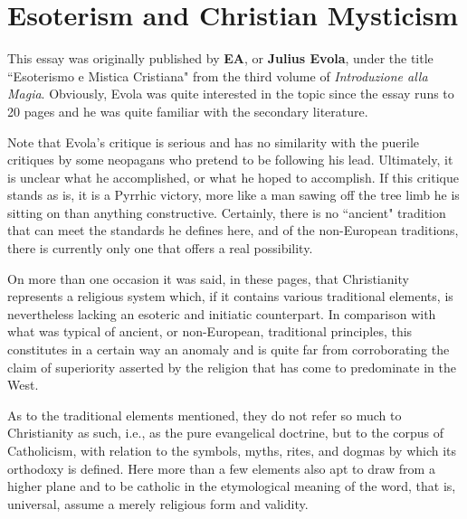 \section{Esoterism and Christian Mysticism}

\begin{quotex}
This essay was originally published by \textbf{EA}, or \textbf{Julius Evola}, under the title ``Esoterismo e Mistica Cristiana" from the third volume of \emph{Introduzione alla Magia}. Obviously, Evola was quite interested in the topic since the essay runs to 20 pages and he was quite familiar with the secondary literature.

Note that Evola's critique is serious and has no similarity with the puerile critiques by some neopagans who pretend to be following his lead. Ultimately, it is unclear what he accomplished, or what he hoped to accomplish. If this critique stands as is, it is a Pyrrhic victory, more like a man sawing off the tree limb he is sitting on than anything constructive. Certainly, there is no ``ancient" tradition that can meet the standards he defines here, and of the non-European traditions, there is currently only one that offers a real possibility.
\end{quotex}

On more than one occasion it was said, in these pages, that Christianity represents a religious system which, if it contains various traditional elements, is nevertheless lacking an esoteric and initiatic counterpart. In comparison with what was typical of ancient, or non-European, traditional principles, this constitutes in a certain way an anomaly and is quite far from corroborating the claim of superiority asserted by the religion that has come to predominate in the West.

As to the traditional elements mentioned, they do not refer so much to Christianity as such, i.e., as the pure evangelical doctrine, but to the corpus of Catholicism, with relation to the symbols, myths, rites, and dogmas by which its orthodoxy is defined. Here more than a few elements also apt to draw from a higher plane and to be catholic in the etymological meaning of the word, that is, universal, assume a merely religious form and validity.

